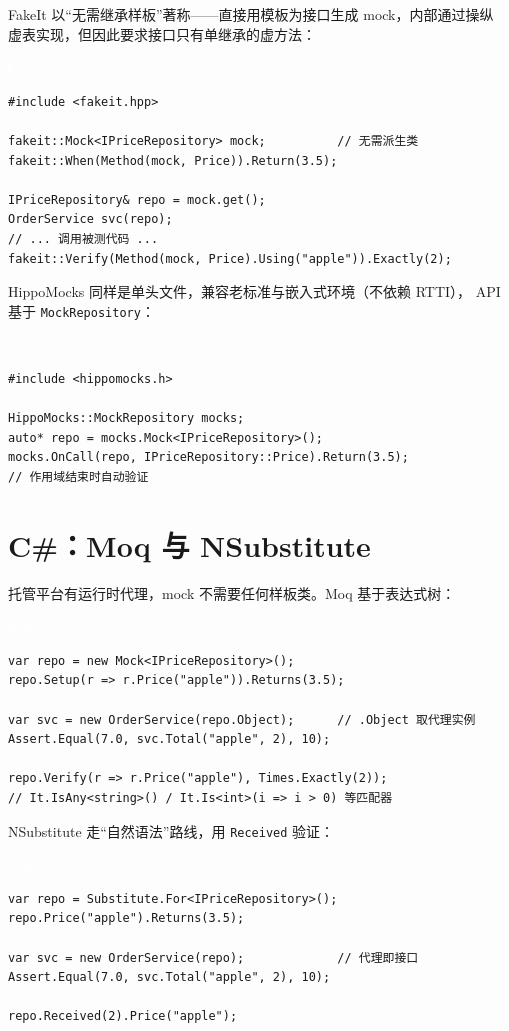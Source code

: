 \documentclass[12pt,a4paper,fontset=fandol]{ctexbook}
\newcommand{\cpplabel}{%
  \begin{tcolorbox}[enhanced,colback=cppheadbg,colframe=cppheadbg,
    arc=1mm,boxrule=0mm,left=6pt,right=6pt,top=2pt,bottom=2pt,
    halign=left,oversize]
    \textcolor{white}{\small\bfseries C++}
  \end{tcolorbox}\vspace{-4pt}}
\newcommand{\csharplabel}{%
  \begin{tcolorbox}[enhanced,colback=csharpheadbg,colframe=csharpheadbg,
    arc=1mm,boxrule=0mm,left=6pt,right=6pt,top=2pt,bottom=2pt,
    halign=left,oversize]
    \textcolor{white}{\small\bfseries C\#}
  \end{tcolorbox}\vspace{-4pt}}
\begin{document}
FakeIt 以“无需继承样板”著称——直接用模板为接口生成 mock，内部通过操纵
虚表实现，但因此要求接口只有单继承的虚方法：

\cpplabel
\begin{lstlisting}
#include <fakeit.hpp>

fakeit::Mock<IPriceRepository> mock;          // 无需派生类
fakeit::When(Method(mock, Price)).Return(3.5);

IPriceRepository& repo = mock.get();
OrderService svc(repo);
// ... 调用被测代码 ...
fakeit::Verify(Method(mock, Price).Using("apple")).Exactly(2);
\end{lstlisting}

HippoMocks 同样是单头文件，兼容老标准与嵌入式环境（不依赖 RTTI），
API 基于 \texttt{MockRepository}：

\cpplabel
\begin{lstlisting}
#include <hippomocks.h>

HippoMocks::MockRepository mocks;
auto* repo = mocks.Mock<IPriceRepository>();
mocks.OnCall(repo, IPriceRepository::Price).Return(3.5);
// 作用域结束时自动验证
\end{lstlisting}

\section{C\#：Moq 与 NSubstitute}

托管平台有运行时代理，mock 不需要任何样板类。Moq 基于表达式树：

\csharplabel
\begin{lstlisting}
var repo = new Mock<IPriceRepository>();
repo.Setup(r => r.Price("apple")).Returns(3.5);

var svc = new OrderService(repo.Object);      // .Object 取代理实例
Assert.Equal(7.0, svc.Total("apple", 2), 10);

repo.Verify(r => r.Price("apple"), Times.Exactly(2));
// It.IsAny<string>() / It.Is<int>(i => i > 0) 等匹配器
\end{lstlisting}

NSubstitute 走“自然语法”路线，用 \texttt{Received} 验证：

\csharplabel
\begin{lstlisting}
var repo = Substitute.For<IPriceRepository>();
repo.Price("apple").Returns(3.5);

var svc = new OrderService(repo);             // 代理即接口
Assert.Equal(7.0, svc.Total("apple", 2), 10);

repo.Received(2).Price("apple");
\end{lstlisting}
\end{document}
